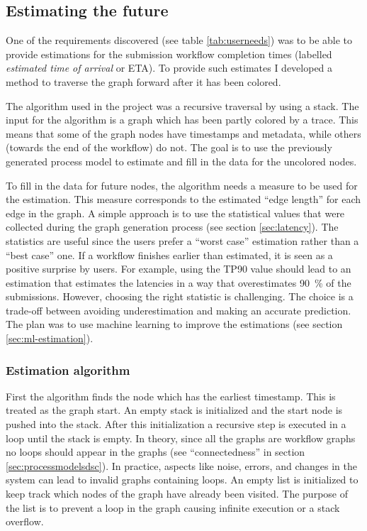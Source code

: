 \subsection{Estimating the future}

One of the requirements discovered (see table \ref{tab:userneeds}) was to be able to provide estimations for the submission workflow completion times (labelled \emph{estimated time of arrival} or ETA). 
To provide such estimates I developed a method to traverse the graph forward after it has been colored.

The algorithm used in the project was a recursive traversal by using a stack.
The input for the algorithm is a graph which has been partly colored by a trace.
This means that some of the graph nodes have timestamps and metadata, while others (towards the end of the workflow) do not.
The goal is to use the previously generated process model to estimate
and fill in the data for the uncolored nodes.

To fill in the data for future nodes, the algorithm needs a measure to be used for the estimation. 
This measure corresponds to the estimated ``edge length'' for each edge in the graph.
A simple approach is to use the statistical values that were collected during the graph generation process (see section \ref{sec:latency}).
The statistics are useful since the users prefer a ``worst case'' estimation rather than a ``best case'' one.
If a workflow finishes earlier than estimated, it is seen as a positive surprise by users.
For example, using the TP90 value should lead to an estimation that estimates the latencies in a way that overestimates 90~\% of the submissions.
However, choosing the right statistic is challenging.
The choice is a trade-off between avoiding underestimation and making an accurate prediction.
The plan was to use machine learning to improve the estimations (see section \ref{sec:ml-estimation}).


\subsubsection{Estimation algorithm}
First the algorithm finds the node which has the earliest timestamp.
This is treated as the graph start.
An empty stack is initialized and the start node is pushed into the stack.
After this initialization a recursive step is executed in a loop until the stack is empty.
In theory, since all the graphs are workflow graphs no loops should appear in the graphs (see ``connectedness'' in section \ref{sec:processmodelsdsc}). 
In practice, aspects like noise, errors, and changes in the system can lead to invalid graphs containing loops.
An empty list is initialized to keep track which nodes of the graph have already been visited.
The purpose of the list is to prevent a loop in the graph causing infinite execution or a stack overflow.

